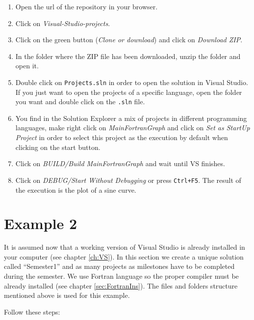 \begin{enumerate}[nosep]
    \item Open the url of the repository in your browser.
    \item Click on \textit{Visual-Studio-projects}.
    \item Click on the green button (\textit{Clone or download}) and click on \textit{Download ZIP}.
    \item In the folder where the ZIP file has been downloaded, unzip the folder and open it. 
    \item Double click on \texttt{Projects.sln} in order to open the solution in Visual Studio. If you just want to open the projects of a specific language, open the folder you want and double click on the \texttt{.sln} file.
    \item You find in the Solution Explorer a mix of projects in different programming languages, make right click on \textit{MainFortranGraph} and click on \textit{Set as StartUp Project} in order to select this project as the execution by default when clicking on the start button.
    \item Click on \textit{BUILD/Build MainFortranGraph} and wait until VS finishes.
    \item Click on \textit{DEBUG/Start Without Debugging} or press \texttt{Ctrl+F5}. The result of the execution is the plot of a sine curve.
\end{enumerate}
 

\newpage
\FloatBarrier
\section{Example 2} \label{sec:Example2}

It is assumed now that a working version of Visual Studio is already installed in your computer (see chapter \ref{ch:VS}). In this section we create a unique solution called ``Semester1'' and as many projects as milestones have to be completed during the semester. We use Fortran language so the proper compiler must be already installed (see chapter \ref{sec:FortranIns}). The files and folders structure mentioned above is used for this example. 

Follow these steps:


